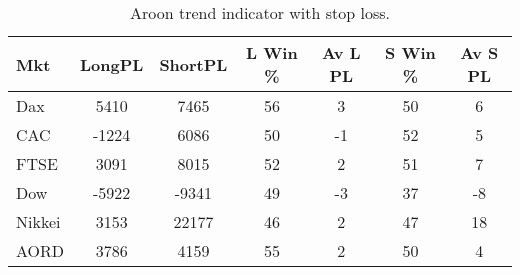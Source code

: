 \begin{table}[ht]
\centering
\caption[Aroon trend indicator with Stop Loss]{Aroon trend indicator with stop loss.} 
\label{tab:aroon_results_sloss}
\begin{tabular}{lcccccc}
  \toprule Mkt & LongPL & ShortPL & L Win \% & Av L PL & S Win \% & Av S PL \\ 
  \midrule Dax & 5410 & 7465 & 56 & 3 & 50 & 6 \\ 
  CAC & -1224 & 6086 & 50 & -1 & 52 & 5 \\ 
  FTSE & 3091 & 8015 & 52 & 2 & 51 & 7 \\ 
  Dow & -5922 & -9341 & 49 & -3 & 37 & -8 \\ 
  Nikkei & 3153 & 22177 & 46 & 2 & 47 & 18 \\ 
  AORD & 3786 & 4159 & 55 & 2 & 50 & 4 \\ 
   \bottomrule \end{tabular}
\end{table}
